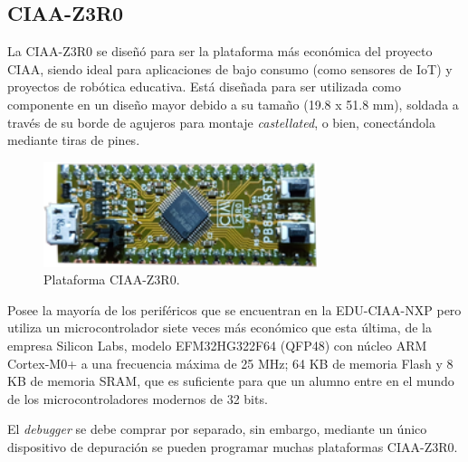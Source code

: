 
\subsection{CIAA-Z3R0}
\label{sec:CIAA-Z3R0}

La CIAA-Z3R0 se diseñó para ser la plataforma más económica del proyecto CIAA, siendo ideal para aplicaciones de bajo consumo (como sensores de IoT) y proyectos de robótica educativa. Está diseñada para ser utilizada como componente en un diseño mayor debido a su tamaño (19.8 x 51.8 mm), soldada a través de su borde de agujeros para montaje \emph{castellated}, o bien, conectándola mediante tiras de pines.

\begin{figure}[!htbp]
\begin{center}  %
\includegraphics*[width=8cm]{Figures/CIAA-Z3R0_Foto.png}
\par\caption{Plataforma CIAA-Z3R0.}\label{fig:ciaaZero}
\end{center}
\end{figure}

Posee la mayoría de los periféricos que se encuentran en la EDU-CIAA-NXP pero utiliza un microcontrolador siete veces más económico que esta última, de la empresa Silicon Labs, modelo EFM32HG322F64 (QFP48) \citep{EFM32HG322F64} con núcleo ARM Cortex-M0+ a una frecuencia máxima de 25 MHz; 64 KB de memoria Flash y 8 KB de memoria SRAM, que es suficiente para que un alumno entre en el mundo de los microcontroladores modernos de 32 bits.

El \emph{debugger} se debe comprar por separado, sin embargo, mediante un único dispositivo de depuración se pueden programar muchas plataformas CIAA-Z3R0.


